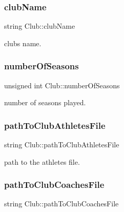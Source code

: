 \subsubsection{\texorpdfstring{club\+Name}{clubName}}
{\footnotesize\ttfamily string Club\+::club\+Name\hspace{0.3cm}{\ttfamily [private]}}



club\textquotesingle{}s name. 

\hypertarget{class_club_a953a3ef4d0bde6a35ff94f481aba34cb}{}\label{class_club_a953a3ef4d0bde6a35ff94f481aba34cb} 
\subsubsection{\texorpdfstring{number\+Of\+Seasons}{numberOfSeasons}}
{\footnotesize\ttfamily unsigned int Club\+::number\+Of\+Seasons\hspace{0.3cm}{\ttfamily [private]}}



number of seasons played. 

\hypertarget{class_club_ad3865f52b2164f79107444b5959ee931}{}\label{class_club_ad3865f52b2164f79107444b5959ee931} 
\subsubsection{\texorpdfstring{path\+To\+Club\+Athletes\+File}{pathToClubAthletesFile}}
{\footnotesize\ttfamily string Club\+::path\+To\+Club\+Athletes\+File\hspace{0.3cm}{\ttfamily [private]}}



path to the athletes\textquotesingle{} file. 

\hypertarget{class_club_adf720213158504d95078824fc769918e}{}\label{class_club_adf720213158504d95078824fc769918e} 
\subsubsection{\texorpdfstring{path\+To\+Club\+Coaches\+File}{pathToClubCoachesFile}}
{\footnotesize\ttfamily string Club\+::path\+To\+Club\+Coaches\+File\hspace{0.3cm}{\ttfamily [private]}}



